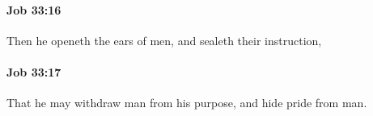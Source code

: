 		\paragraph{Job 33:16} %
			\label{JOB-33-16}

			Then he openeth the ears of men, and sealeth their instruction,


		\paragraph{Job 33:17} %
			\label{JOB-33-17}

			That he may withdraw man from his purpose, and hide pride from man.


